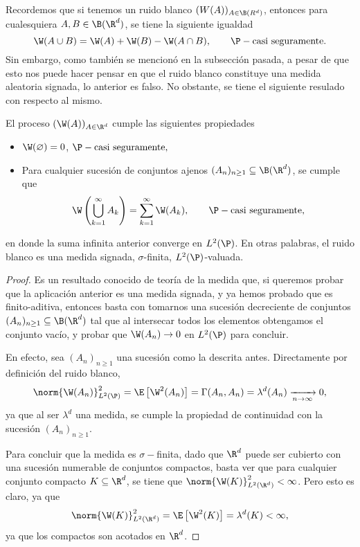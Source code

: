 Recordemos que si tenemos un ruido blanco $(W(A))_{A\in \B(R^{d})}$, entonces para cualesquiera $A,B \in \B(\R^{d})$, se tiene la siguiente igualdad
\[
\W(A\cup B)=\W(A)+\W(B)-\W(A\cap B), \qquad \P-\text{casi seguramente.}   
\]
Sin embargo, como también se mencionó en la subsección pasada, a pesar de que esto nos puede hacer pensar en que el ruido blanco constituye una medida aleatoria signada, lo anterior es falso. No obstante, se tiene el siguiente resulado con respecto al mismo.
\begin{prop}\label{Finito_aditiv_ruido_blanco}
 El proceso $(\W(A))_{A\in \R^{d}}$ cumple las siguientes propiedades
 \begin{itemize}
    \item $\W(\varnothing)=0$, \qquad $\P-\text{casi seguramente,}$
    \item Para cualquier sucesión de conjuntos ajenos $(A_n)_{n\geq 1}\subseteq \B(\R^d)$, se cumple que 
    \[
    \W \left(\bigcup_{k=1}^\infty A_k\right)=\sum_{k=1}^{\infty}\W(A_k), \qquad \P-\text{casi seguramente,} 
    \]
 \end{itemize}
 en donde la suma infinita anterior converge en $L^2(\P)$. En otras palabras, el 
 ruido blanco es una medida signada, $\sigma$-finita, $L^2(\P)$-valuada.
\end{prop}
\begin{proof} 
   Es un resultado conocido de teoría de la medida que, si queremos probar que la aplicación anterior es una medida signada, y ya hemos probado que es finito-aditiva, entonces basta con tomarnos una sucesión decreciente de conjuntos $(A_n)_{n\geq1}\subseteq\B(\R^{d})$ tal que al intersecar todos los elementos obtengamos el conjunto vacío, y probar que $\W(A_n)\to 0$ en $L^{2}(\P)$ para concluir.

   En efecto, sea $(A_n)_{n\geq1}$ una sucesión como la descrita antes. Directamente por definición del ruido blanco, 
   \[
   \norm{\W(A_n)}_{L^2(\P)}^2=\E\left[\W^2(A_n)\right]=\Gamma(A_n,A_n)=\lambda^{d}(A_n)\xrightarrow[n\to\infty]{}0,    
   \]
   ya que al ser $\lambda^d$ una medida, se cumple la propiedad de continuidad con la sucesión $(A_n)_{n\geq1}$.

   Para concluir que la medida es $\sigma-$finita, dado que $\R^{d}$ puede ser cubierto con una sucesión numerable de conjuntos compactos, basta ver que para cualquier conjunto compacto $K\subseteq\R^{d}$, se tiene que $\norm{\W(K)}_{L^ {2}(\R^{d})}^2<\infty$. Pero esto es claro, ya que 
   \[
       \norm{\W(K)}_{L^ {2}(\R^{d})}^2=\E\left[\W^2(K)\right]=\lambda^{d}(K)<\infty,
   \]
   ya que los compactos son acotados en $\R^{d}$.
 \end{proof}  
